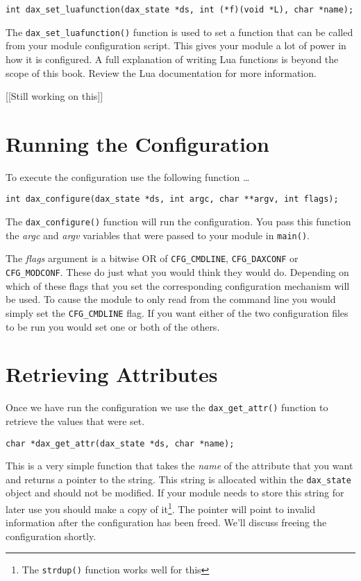 \begin{verbatim}
int dax_set_luafunction(dax_state *ds, int (*f)(void *L), char *name);
\end{verbatim}

The \verb|dax_set_luafunction()|
function is used to set a function that can be called from your module
configuration script.  This gives your module a lot of power in how it is
configured.  A full explanation of writing Lua functions is beyond the scope of
this book.  Review the Lua documentation for more information.

[[Still working on this]]

\section{Running the Configuration}
To execute the configuration use the following function \ldots
\begin{verbatim}
int dax_configure(dax_state *ds, int argc, char **argv, int flags);
\end{verbatim}

The \verb|dax_configure()| function will run
the configuration.  You pass this function the \textit{argc} and \textit{argv}
variables that were passed to your module in \verb|main()|.

The \textit{flags} argument is a bitwise OR of \verb|CFG_CMDLINE|,
\verb|CFG_DAXCONF| or \verb|CFG_MODCONF|.  These do just what you would think
they would do.  Depending on which of these flags that you set the corresponding
configuration mechanism will be used.  To cause the module to only read from the
command line you would simply set the \verb|CFG_CMDLINE| flag. If you want
either of the two configuration files to be run you would set one or both of the
others.

\section{Retrieving Attributes}

Once we have run the configuration we use the
\verb|dax_get_attr()| function to retrieve the
values that were set.

\begin{verbatim}
char *dax_get_attr(dax_state *ds, char *name);
\end{verbatim}

This is a very simple function that takes the \textit{name} of the attribute
that you want and returns a pointer to the string.  This string is allocated
within the \verb|dax_state| object and should not be modified.  If your module
needs to store this string for later use you should make a copy of
it\footnote{The \texttt{strdup()} function works well for this}.  The pointer
will point to invalid information after the configuration has been freed.  We'll
discuss freeing the configuration shortly.

